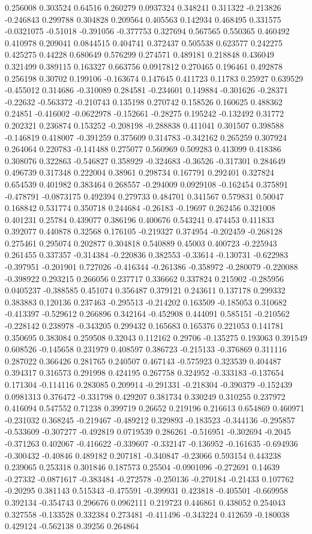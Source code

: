 0.256008 0.303524 0.64516 0.260279 0.0937324 0.348241 0.311322 -0.213826 -0.246843 0.299788 0.304828 0.209564 0.405563 0.142934 0.468495 0.331575 -0.0321075 -0.51018 -0.391056 -0.377753 0.327694 0.567565 0.550365 0.460492 0.410978 0.209041 0.0844515 0.404741 0.372437 0.505538 0.623577 0.242275 0.425275 0.44228 0.680649 0.576299 0.274571 0.489181 0.218848 0.436049 0.321499 0.389115 0.163327 0.663756 0.0917812 0.270465 0.196461 0.492878 0.256198 0.30702 0.199106 -0.163674 0.147645 0.411723 0.11783 0.25927 0.639529 -0.455012 0.314686 -0.310089 0.284581 -0.234601 0.149884 -0.301626 -0.28371 -0.22632 -0.563372 -0.210743 0.135198 0.270742 0.158526 0.160625 0.488362 0.24851 -0.416002 -0.0622978 -0.152661 -0.28275 0.195242 -0.132492 0.31772 0.202321 0.236874 0.153252 -0.208198 -0.288838 0.411041 0.301507 0.398588 -0.146819 0.418007 -0.391259 0.375609 0.314783 -0.342162 0.265259 0.307924 0.264064 0.220783 -0.141488 0.275077 0.560969 0.509283 0.413099 0.418386 0.308076 0.322863 -0.546827 0.358929 -0.324683 -0.36526 -0.317301 0.284649 0.496739 0.317348 0.222004 0.38961 0.298734 0.167791 0.292401 0.327824 0.654539 0.401982 0.383464 0.268557 -0.294009 0.0929108 -0.162454 0.375891 -0.478791 -0.0873175 0.492394 0.279733 0.484701 0.341567 0.579831 0.50047 0.168842 0.531774 0.350718 0.244684 -0.26183 -0.19697 0.262456 0.321008 0.401231 0.25784 0.439077 0.386196 0.400676 0.543241 0.474453 0.411833 0.392077 0.440878 0.32568 0.176105 -0.219327 0.374954 -0.202459 -0.268128 0.275461 0.295074 0.202877 0.304818 0.540889 0.45003 0.400723 -0.225943 0.261455 0.337357 -0.314384 -0.220836 0.382553 -0.33614 -0.130731 -0.622983 -0.397951 -0.201901 0.727026 -0.416344 -0.261386 -0.358972 -0.280079 -0.220088 -0.398922 0.293215 0.266056 0.237717 0.336662 0.337824 0.215902 -0.285956 0.0405237 -0.388585 0.451074 0.356487 0.379121 0.243611 0.137178 0.299332 0.383883 0.120136 0.237463 -0.295513 -0.214202 0.163509 -0.185053 0.310682 -0.413397 -0.529612 0.266896 0.342164 -0.452908 0.444091 0.585151 -0.210562 -0.228142 0.238978 -0.343205 0.299432 0.165683 0.165376 0.221053 0.141781 0.350695 0.383084 0.259508 0.32043 0.112162 0.29706 -0.135275 0.193063 0.391549 0.608526 -0.145658 0.231979 0.408597 0.386723 -0.215133 -0.376869 0.311116 0.287022 0.366426 0.281765 0.240507 0.467143 -0.575923 0.323539 0.404487 0.394317 0.316573 0.291998 0.424195 0.267758 0.324952 -0.333183 -0.137654 0.171304 -0.114116 0.283085 0.209914 -0.291331 -0.218304 -0.390379 -0.152439 0.0981313 0.376472 -0.331798 0.429207 0.381734 0.330249 0.310255 0.237972 0.416094 0.547552 0.71238 0.399719 0.26652 0.219196 0.216613 0.654869 0.460971 -0.231032 0.368245 -0.219467 -0.489212 0.329893 -0.183523 -0.344136 -0.295857 -0.533609 -0.307277 -0.492819 0.0719539 0.286261 -0.516951 -0.302694 -0.2045 -0.371263 0.402067 -0.416622 -0.339607 -0.332147 -0.136952 -0.161635 -0.694936 -0.300432 -0.40846 0.489182 0.207181 -0.340847 -0.23066 0.593154 0.443238 0.239065 0.253318 0.301846 0.187573 0.25504 -0.0901096 -0.272691 0.14639 -0.27332 -0.0871617 -0.383484 -0.272578 -0.250136 -0.270184 -0.21433 0.107762 -0.20295 0.381143 0.515343 -0.475591 -0.399931 0.423818 -0.405501 -0.669958 0.392134 -0.354743 0.296676 0.0962111 0.219723 0.446861 0.438052 0.254043 0.327558 -0.133528 0.332384 0.273481 -0.411496 -0.343224 0.412659 -0.180038 0.429124 -0.562138 0.39256 0.264864 